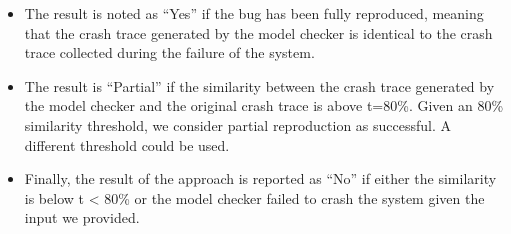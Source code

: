 \begin{itemize}
  \item The result is noted as ``Yes'' if the bug has been fully
reproduced, meaning that the crash trace generated by the
model checker is identical to the crash trace collected
during the failure of the system.
\item The result is ``Partial'' if the similarity between the crash
trace generated by the model checker and the original
crash trace is above t=80\%. Given an 80\% similarity
threshold, we consider partial reproduction as successful.
A different threshold could be used.
\item Finally, the result of the approach is reported as ``No'' if
either the similarity is below t < 80\% or the model
checker failed to crash the system given the input we
provided.
\end{itemize}


